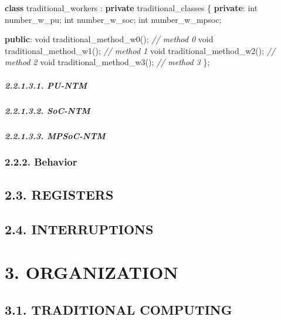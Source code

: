 \documentclass[
]{article}
\newenvironment{Shaded}{}{}
\newcommand{\CommentTok}[1]{\textcolor[rgb]{0.38,0.63,0.69}{\textit{#1}}}
\newcommand{\DataTypeTok}[1]{\textcolor[rgb]{0.56,0.13,0.00}{#1}}
\newcommand{\KeywordTok}[1]{\textcolor[rgb]{0.00,0.44,0.13}{\textbf{#1}}}
\newcommand{\NormalTok}[1]{#1}
\begin{document}
\begin{Shaded}
\begin{Highlighting}[]
\KeywordTok{class}\NormalTok{ traditional\_workers : }\KeywordTok{private}\NormalTok{ traditional\_classes \{}
   \KeywordTok{private}\NormalTok{:}
      \DataTypeTok{int}\NormalTok{ number\_w\_pu;}
      \DataTypeTok{int}\NormalTok{ number\_w\_soc;}
      \DataTypeTok{int}\NormalTok{ number\_w\_mpsoc;}

   \KeywordTok{public}\NormalTok{:}
      \DataTypeTok{void}\NormalTok{ traditional\_method\_w0();  }\CommentTok{// method 0}
      \DataTypeTok{void}\NormalTok{ traditional\_method\_w1();  }\CommentTok{// method 1}
      \DataTypeTok{void}\NormalTok{ traditional\_method\_w2();  }\CommentTok{// method 2}
      \DataTypeTok{void}\NormalTok{ traditional\_method\_w3();  }\CommentTok{// method 3}
\NormalTok{\};}
\end{Highlighting}
\end{Shaded}

\hypertarget{pu-ntm-5}{%
\subparagraph{2.2.1.3.1. PU-NTM}\label{pu-ntm-5}}

\hypertarget{soc-ntm-5}{%
\subparagraph{2.2.1.3.2. SoC-NTM}\label{soc-ntm-5}}

\hypertarget{mpsoc-ntm-5}{%
\subparagraph{2.2.1.3.3. MPSoC-NTM}\label{mpsoc-ntm-5}}

\hypertarget{behavior-1}{%
\subsubsection{2.2.2. Behavior}\label{behavior-1}}

\hypertarget{registers-1}{%
\subsection{2.3. REGISTERS}\label{registers-1}}

\hypertarget{interruptions-1}{%
\subsection{2.4. INTERRUPTIONS}\label{interruptions-1}}

\hypertarget{organization-1}{%
\section{3. ORGANIZATION}\label{organization-1}}

\hypertarget{traditional-computing-1}{%
\subsection{3.1. TRADITIONAL COMPUTING}\label{traditional-computing-1}}
\end{document}
